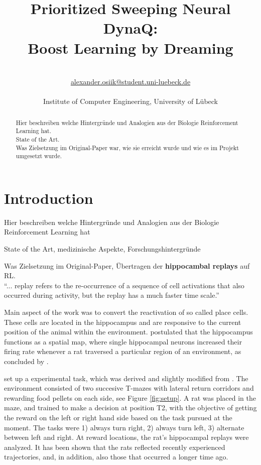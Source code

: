 \documentclass[a4paper]{article}
\title{\textbf{Prioritized Sweeping Neural DynaQ:\\ Boost Learning by Dreaming}}\let\Title\@title
\author{\AuthorName\\
	\href{mailto:alexander.osiik@student.uni-luebeck.de}{alexander.osiik@student.uni-luebeck.de}\\
	\small \seminar\\
	\small Institute of Computer Engineering, University of L\"ubeck\\
}\let\Author\@author
\begin{document}
	\maketitle
	
	\begin{abstract}
		\noindent%
		Hier beschreiben welche Hintergründe und Analogien aus der Biologie Reinforcement Learning hat.\\
		State of the Art.\\
		Was Zielsetzung im Original-Paper war, wie sie erreicht wurde und wie es im Projekt umgesetzt wurde.
	\end{abstract}
	
	
	\section{Introduction}
	\label{sec:introduction}
\par Hier beschreiben welche Hintergründe und Analogien aus der Biologie Reinforcement Learning hat
		
\par State of the Art, medizinische Aspekte, Forschungshintergründe
\par Was Zielsetzung im Original-Paper, Übertragen der \textbf{hippocambal replays} auf RL.\\
		``... replay refers to the re-occurrence of a sequence of cell activations that also occurred during activity, but the replay has a much faster time scale.''
		
		\par Main aspect of the work was to convert the reactivation of so called place cells. These cells are located in the hippocampus and are responsive to the current position of the animal within the environment. \cite{OKEEFE1971171} postulated that the hippocampus functions as a spatial map, where single hippocampal neurons increased their firing rate whenever a rat traversed a particular region of an environment, as concluded by \cite{Nakazawa}.
		
		\par \cite{NeuralDynaQ} set up a experimental task, which was derived and slightly modified from \cite{GUPTA2010695}. The environment consisted of two succesive T-mazes with lateral return corridors and rewarding food pellets on each side, see Figure \ref{fig:setup}. A rat was placed in the maze, and trained to make a decision at position T2, with the objective of getting the reward on the left or right hand side based on the task pursued at the moment. The tasks were 1) always turn right, 2) always turn left, 3) alternate between left and right. At reward locations, the rat's hippocampal replays were analyzed. It has been shown that the rats reflected recently experienced trajectories, and, in addition, also those that occurred a longer time ago.
		
\end{document}

